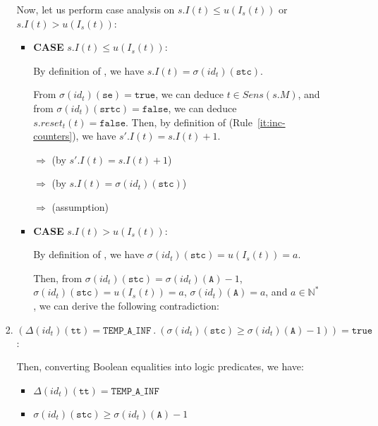\documentclass[dvipsnames,12pt]{article}
\begin{document}
\begin{niproof}
\begin{enumerate}
\begin{enumerate}
\begin{enumerate}
        Now, let us perform case analysis on
        $s.I(t)\le{}u(I_s(t))$ or $s.I(t)>u(I_s(t))$:
        \begin{itemize}
        \item \textbf{CASE} $s.I(t)\le{}u(I_s(t))$:
          
          By definition of \upSim, we have $s.I(t)=\sigma(id_t)(\texttt{stc})$.

          From $\sigma(id_t)(\texttt{se})=\mathtt{true}$, we can deduce
          $t\in{}Sens(s.M)$, and from
          $\sigma(id_t)(\texttt{srtc})=\mathtt{false}$, we can deduce
          $s.reset_t(t)=\mathtt{false}$. Then, by definition of
          \dwSitpn{} (Rule~\ref{it:inc-counters}), we have
          $s'.I(t)=s.I(t)+1$.

          $\Rightarrow{}$
           (by $s'.I(t)=s.I(t)+1$)

          $\Rightarrow{}$
          (by $s.I(t)=\sigma(id_t)(\texttt{stc})$)

          $\Rightarrow{}$
           (assumption)
          
        \item \textbf{CASE} $s.I(t)>u(I_s(t))$:

          By definition of \upSim, we have
          $\sigma(id_t)(\texttt{stc})=u(I_s(t))=a$.

          Then, from $\sigma(id_t)(\texttt{stc})={}\sigma(id_t)(\texttt{A})-1$,
          $\sigma(id_t)(\texttt{stc})=u(I_s(t))=a$,
          $\sigma(id_t)(\texttt{A})=a$, and $a\in\mathbb{N}^{*}$, we can
          derive the following
          contradiction:\\
        \end{itemize}
        
      \item
        $(\Delta(id_t)(\texttt{tt})=\mathtt{TEMP\_A\_INF}~.~(\sigma(id_t)(\texttt{stc})\ge\sigma(id_t)(\texttt{A})-1))=\mathtt{true}$:

        Then, converting Boolean equalities into logic predicates, we
        have:
        \begin{itemize}
        \item $\Delta(id_t)(\texttt{tt})=\mathtt{TEMP\_A\_INF}$
        \item $\sigma(id_t)(\texttt{stc})\ge\sigma(id_t)(\texttt{A})-1$
        \end{itemize}


\end{enumerate}
\end{enumerate}
\end{enumerate}
\end{niproof}
\end{document}

